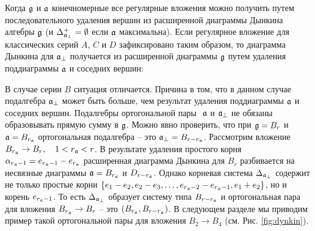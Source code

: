 Когда  $\mathfrak{g}$ и $\mathfrak{a}$ конечномерные все регулярные вложения можно получить путем последовательного удаления вершин из расширенной диаграммы Дынкина алгебры $\mathfrak{g}$ (и  $\Delta_{\mathfrak{a}_{\perp} }^{+}=\emptyset $ если $\mathfrak{a}$ максимальна). Если регулярное вложение для классических серий $A$, $C$ и $D$ зафиксировано таким образом, то диаграмма Дынкина для $\mathfrak{a}_{\perp}$ получается из расширенной диаграммы $\mathfrak{g}$ путем удаления поддиаграммы $\mathfrak{a}$ и соседних вершин:
\begin{table}[tbh]
\label{tab:diagrams} \noindent {}
\caption{Подалгебры $\af,\;\afb$ для классических серий}
\end{table}

В случае серии $B$ ситуация отличается. Причина в том, что в данном случае подалгебра $\mathfrak{a}_{\perp}$ может быть больше, чем результат удаления поддиаграммы  $\mathfrak{a}$ и соседних вершин. Подалгебры ортогональной пары $\ \af$ и $\mathfrak{a}_{\perp}$ не обязаны образовывать прямую сумму в $\mathfrak{g}$. Можно явно проверить, что при  $\mathfrak{g}=B_{r}$ и $\mathfrak{a}=B_{r_{\mathfrak{a}}}$ ортогональная подалгебра -- это $\mathfrak{a}_{\perp}=B_{r-r_{\mathfrak{a}}}$. Рассмотрим вложение $B_{r_{\mathfrak{a}}}\rightarrow B_{r},\quad 1<r_{\mathfrak{a}}<r$. В результате удаления простого корня  $\alpha _{r_{\mathfrak{a}}-1}=e_{r_{\mathfrak{a}}-1}-e_{r_{\mathfrak{a}}}$ расширенная диаграмма Дынкина для $B_{r}$ разбивается на несвязные диаграммы $\mathfrak{a}=B_{r_{\mathfrak{a}}}$ и $D_{r-r_{\mathfrak{a}}}$. Однако корневая система  $\Delta _{\mathfrak{a}_{\perp}}$ содержит не только простые корни  $\left\{ e_{1}-e_{2},e_{2}-e_{3},\ldots ,e_{r_{\mathfrak{a}}-2}-e_{r_{\mathfrak{a}}-1},e_{1}+e_{2}\right\} $, но и корень $e_{r_{\mathfrak{a}}-1}$. То есть  $\Delta _{\mathfrak{a}_{\perp}}$ образует систему типа  $B_{r-r_{\mathfrak{a}}}$ и ортогональная пара для вложения $B_{r_{\mathfrak{a}}}\rightarrow B_{r}$ -- это  $\left( B_{r_{\mathfrak{a}}},B_{r-r_{\mathfrak{a}}}\right) $. В следующем разделе мы приводим пример такой ортогональной пары для вложения $B_{2}\rightarrow B_{4}$ (см. Рис. \ref{fig:dynkin}).

